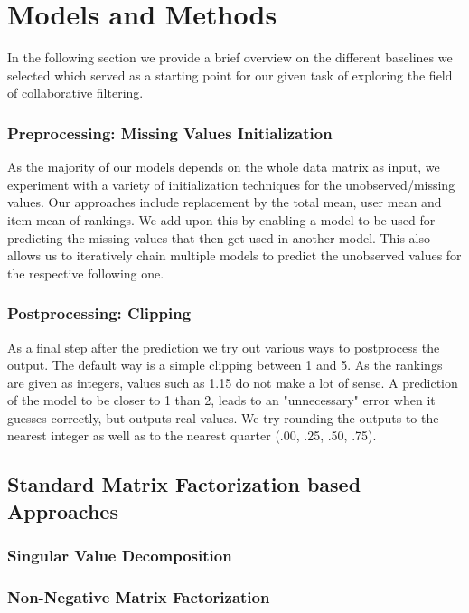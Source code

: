\documentclass[10pt,conference,compsocconf]{IEEEtran}
\begin{document}
    \section{Models and Methods}
    In the following section we provide a brief overview on the different baselines we selected which served as a starting point for our given task of exploring the field of collaborative filtering.

    \subsubsection{Preprocessing: Missing Values Initialization}
    As the majority of our models depends on the whole data matrix as input, we experiment with a variety of initialization techniques for the unobserved/missing values.
    Our approaches include replacement by the total mean, user mean and item mean of rankings.
    We add upon this by enabling a model to be used for predicting the missing values that then get used in another model.
    This also allows us to iteratively chain multiple models to predict the unobserved values for the respective following one.

    \subsubsection{Postprocessing: Clipping}
    As a final step after the prediction we try out various ways to postprocess the output.
    The default way is a simple clipping between 1 and 5.
    As the rankings are given as integers, values such as 1.15 do not make a lot of sense.
    A prediction of the model to be closer to 1 than 2, leads to an "unnecessary" error when it guesses correctly, but outputs real values.
    We try rounding the outputs to the nearest integer as well as to the nearest quarter (.00, .25, .50, .75).

    \subsection{Standard Matrix Factorization based Approaches}

    \subsubsection{Singular Value Decomposition}

    \subsubsection{Non-Negative Matrix Factorization}
\end{document}
